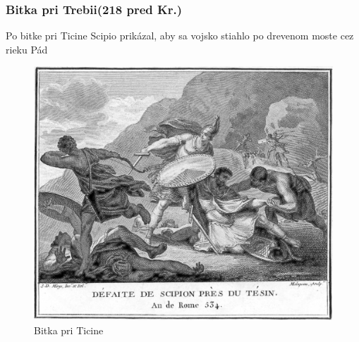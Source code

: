 \documentclass{article}
\begin{document}
\subsubsection{Bitka pri Trebii(218 pred Kr.)}
Po bitke pri Ticine Scipio prikázal, aby sa vojsko stiahlo po drevenom moste cez rieku Pád
\begin{figure}
\center
\includegraphics[scale=0.2]{ticinus.jpg}
\caption{Bitka pri Ticine}
\end{figure}
\end{document}
